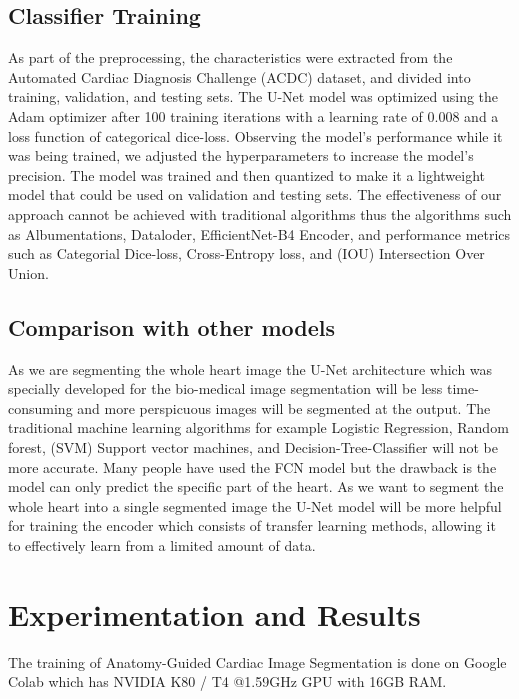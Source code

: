 \documentclass[runningheads]{llncs}
\begin{document}
\subsection{Classifier Training}
As part of the preprocessing, the characteristics were extracted from the Automated Cardiac Diagnosis Challenge (ACDC) dataset, and divided into training, validation, and testing sets. The U-Net model was optimized using the Adam optimizer after 100 training iterations with a learning rate of 0.008 and a loss function of categorical dice-loss. Observing the model’s performance while it was being trained, we adjusted the hyperparameters to increase the model’s precision. The model was trained and then quantized to make it a lightweight model that could be used on validation and testing sets. The effectiveness of our approach cannot be achieved with traditional algorithms thus the algorithms such as Albumentations, Dataloder, EfficientNet-B4 Encoder, and performance metrics such as Categorial Dice-loss, Cross-Entropy loss, and (IOU) Intersection Over Union.


\subsection{Comparison with other models}
As we are segmenting the whole heart image the U-Net architecture which was specially developed for the bio-medical image segmentation will be less time-consuming and more perspicuous images will be segmented at the output. The traditional machine learning algorithms for example Logistic Regression, Random forest, (SVM) Support vector machines, and Decision-Tree-Classifier will not be more accurate. Many people have used the FCN model but the drawback is the model can only predict the specific part of the heart. As we want to segment the whole heart into a single segmented image the U-Net model will be more helpful for training the encoder which consists of transfer learning methods, allowing it to effectively learn from a limited amount of data.

\section{Experimentation and Results}
\label{exp}
The training of Anatomy-Guided Cardiac Image Segmentation is done on Google Colab which has NVIDIA K80 / T4 @1.59GHz GPU with 16GB RAM.
\end{document}
